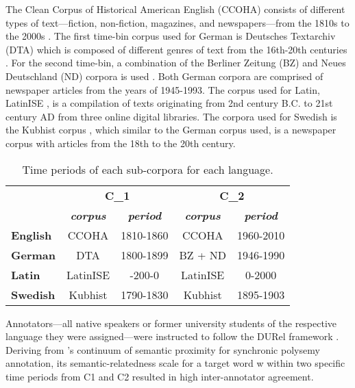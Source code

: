 The Clean Corpus of Historical American English (CCOHA) consists of different types of text—fiction, non-fiction, magazines, and newspapers—from the 1810s to the 2000s \citep{davies2012expanding, alatrash-etal-2020-ccoha}. The first time-bin corpus used for German is Deutsches Textarchiv (DTA) which is composed of different genres of text from the 16th-20th centuries \citep{dta2017}. For the second time-bin, a combination of the Berliner Zeitung (BZ) and Neues Deutschland (ND) corpora is used \citep{berliner2018,neues2018}. Both German corpora are comprised of newspaper articles from the years of 1945-1993. The corpus used for Latin, LatinISE \citep{mcgillivray-kilgarriff}, is a compilation of texts originating from 2nd century B.C. to 21st century AD from three online digital libraries. The corpora used for Swedish is the Kubhist corpus \citep{Kubhist}, which similar to the German corpus used, is a newspaper corpus with articles from the 18th to the 20th century. \hfill \break
\begin{table}[h]
\small
\centering
\begin{tabular}{l|cc|cc|}
\cline{2-5}
\textbf{}      & \multicolumn{2}{c|}{\textbf{C_1}}                    & \multicolumn{2}{c|}{\textbf{C_2}}                    \\
                                       & \textit{\textbf{corpus}} & \textit{\textbf{period}} & \textit{\textbf{corpus}} & \textit{\textbf{period}} \\ \hline
\multicolumn{1}{|l|}{\textbf{English}} & CCOHA                    & 1810-1860                & CCOHA                    & 1960-2010                \\ \hline
\multicolumn{1}{|l|}{\textbf{German}}  & DTA                      & 1800-1899                & BZ + ND                  & 1946-1990                \\ \hline
\multicolumn{1}{|l|}{\textbf{Latin}}   & LatinISE                 & -200-0                   & LatinISE                 & 0-2000                   \\ \hline
\multicolumn{1}{|l|}{\textbf{Swedish}} & Kubhist                  & 1790-1830                & Kubhist                  & 1895-1903                \\ \hline
\end{tabular}
\caption{Time periods of each sub-corpora for each language.}
\label{tab:subcorpora-time}
\end{table}
\hfill \break
Annotators—all native speakers or former university students of the respective language they were assigned—were instructed to follow the DURel framework \citep{DURel2018}. Deriving from \citet{blank1997prinzipien}’s continuum of semantic proximity for synchronic polysemy annotation, its semantic-relatedness scale for a target word w within two specific time periods from C1 and C2 resulted in high inter-annotator agreement. 
	
